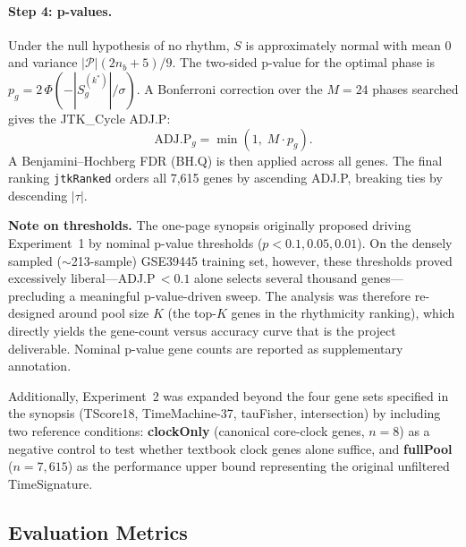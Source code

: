\documentclass[10pt,a4paper]{article}
\begin{document}
\paragraph{Step 4: p-values.}
Under the null hypothesis of no rhythm, $S$ is approximately normal
with mean 0 and variance $|\mathcal{P}|(2n_b+5)/9$.
The two-sided p-value for the optimal phase is
$p_g = 2\,\Phi(-|S_g^{(k^*)}|/\sigma)$.
A Bonferroni correction over the $M = 24$ phases searched gives the
JTK\_Cycle ADJ.P:
\begin{equation}
  \text{ADJ.P}_g = \min(1,\; M \cdot p_g).
  \label{eq:adjp}
\end{equation}
A Benjamini--Hochberg FDR (BH.Q) is then applied across all genes.
The final ranking \texttt{jtkRanked} orders all 7,615 genes by
ascending ADJ.P, breaking ties by descending $|\tau|$.
 
\textbf{Note on thresholds.}
The one-page synopsis originally proposed driving Experiment~1 by
nominal p-value thresholds ($p < 0.1, 0.05, 0.01$).
On the densely sampled (${\sim}$213-sample) GSE39445 training set,
however, these thresholds proved excessively liberal---ADJ.P\,$< 0.1$
alone selects several thousand genes---precluding a meaningful
p-value-driven sweep.
The analysis was therefore re-designed around pool size $K$ (the
top-$K$ genes in the rhythmicity ranking), which directly yields
the gene-count versus accuracy curve that is the project deliverable.
Nominal p-value gene counts are reported as supplementary annotation.
 
Additionally, Experiment~2 was expanded beyond the four gene sets
specified in the synopsis (TScore18, TimeMachine-37, tauFisher,
intersection) by including two reference conditions: \textbf{clockOnly}
(canonical core-clock genes, $n = 8$) as a negative control to test
whether textbook clock genes alone suffice, and \textbf{fullPool}
($n = 7{,}615$) as the performance upper bound representing the
original unfiltered TimeSignature.
 
\subsection{Evaluation Metrics}
 
\end{document}
